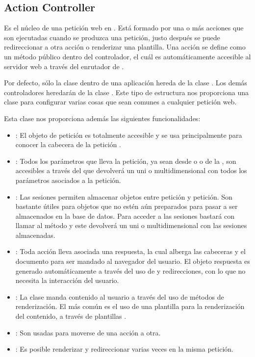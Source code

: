 \subsection{Action Controller}
Es el núcleo de una petición web en . Está formado por
una o más acciones que son ejecutadas cuando se produzca una petición, justo
después se puede redireccionar a otra acción o renderizar una plantilla. Una
acción se define como un método público dentro del controlador, el cuál es
automáticamente accesible al servidor web a través del enrutador de
.

Por defecto, sólo la clase  dentro de una
aplicación  hereda de la clase
. Los demás controladores heredarán de la clase
. Este tipo de estructura nos proporciona una
clase para configurar varias cosas que sean comunes a cualquier petición web.

Esta clase nos proporciona además las siguientes funcionalidades:

\begin{itemize}
\item {}: El objeto de petición es totalmente accesible y se
  usa principalmente para conocer la cabecera de la petición .
\item {}: Todos los parámetros que lleva la petición, ya sean
  desde  o  o de la , son accesibles a
  través del   que devolverá un 
  uni o multidimensional con todos los parámetros asociados a la petición.
\item {}: Las sesiones permiten almacenar objetos entre petición
  y petición. Son bastante útiles para objetos que no estén aún preparados para
  pasar a ser almacenados en la base de datos. Para acceder a las sesiones
  bastará con llamar al método  y este devolverá un
   uni o multidimensional con las sesiones almacenadas.
\item {}: Toda acción lleva asociada una respuesta, la cual
  alberga las cabeceras y el documento para ser mandado al navegador del
  usuario. El objeto respuesta es generado automáticamente a través del uso de
   y redirecciones, con lo que no necesita la interacción del
  usuario.
\item {}: La clase  manda
  contenido al usuario a través del uso de métodos de renderización. El más
  común es el uso de una plantilla para la renderización del contenido, a través
  de plantillas .
\item {}: Son usadas para moverse de una acción a otra.
\item {}: Es posible renderizar
  y redireccionar varias veces en la misma petición.
\end{itemize}

